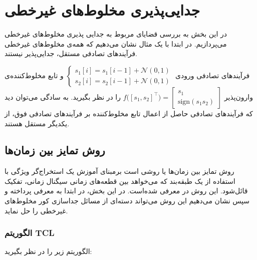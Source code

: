 \documentclass[oneside]{thesis}
\begin{document}
\chapter{جدایی‌پذیری مخلوط‌های غیرخطی}
\label{seprability}
در این بخش به بررسی قضایای مربوط به جدایی پذیری مخلوط‌های غیرخطی می‌پردازیم. در ابتدا با یک مثال نشان می‌دهیم که همه‌ی مخلوط‌های غیرخطی فرآیند‌های تصادفی مستقل، جدایی‌پذیر نیستند.

\begin{example}
	
	
	فرآیند‌های تصادفی ورودی
$
\begin{cases}
s_1[i] = s_1[i-1] + \mathcal{N}(0,1)\\
s_2[i] = s_2[i-1] + \mathcal{N}(0,1)
\end{cases}
$
	و تابع مخلوط‌کننده‌ی  وارون‌پذیر
$ f\big([s_1, s_2]^\top\big)= 
\begin{bmatrix}
s_1\\
\mathrm{sign}(s_1s_2)
\end{bmatrix}
$
را در نظر بگیرید. به سادگی می‌توان دید که فرآیند‌های تصادفی حاصل از اعمال تابع مخلوط‌کننده بر فرآیندهای تصادفی فوق، از یکدیگر مستقل هستند.
\end{example}

\section{
	روش تمایز بین زمان‌ها
}
روش تمایز بین زمان‌ها یا 
روشی است برمبنای آموزش یک استخراج‌گر ویژگی با استفاده از یک طبقه‌بند
که می‌خواهد بین قطعه‌های زمانی سیگنال زمانی، تفکیک قائل‌شود. این روش در 
\cite{TCL}
معرفی شده‌است. در این بخش، در ابتدا به معرفی 
پرداخته و سپس نشان می‌دهیم این روش می‌تواند دسته‌ای از مسائل جداسازی کور مخلوط‌های غیرخطی را حل نماید.

\subsection{الگوریتم 
	TCL
}

الگوریتم زیر را در نظر بگیرید:
\end{document}
